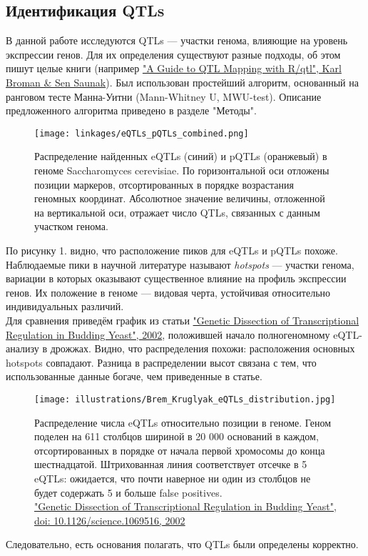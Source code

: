 \documentclass[11pt,a4paper]{report}
\theoremstyle{definition}
\theoremstyle{definition}
\theoremstyle{definition}
\begin{document}
	\subsection{Идентификация QTLs}
	   В данной работе исследуются QTLs — участки генома, влияющие на уровень экспрессии генов. Для их определения существуют разные подходы, об этом пишут целые книги (например \href{https://www.springer.com/gp/book/9780387921242}{"A Guide to QTL Mapping with R/qtl", Karl Broman \& Sen Saunak}). Был использован простейший алгоритм, основанный на ранговом тесте Манна-Уитни (Mann-Whitney U, MWU-test). Описание предложенного алгоритма приведено в разделе "Методы".
		\begin{figure}[H]
			\centering
			\texttt{[image: linkages/eQTLs\_pQTLs\_combined.png]}
			\caption{Распределение найденных eQTLs (синий) и pQTLs (оранжевый) в геноме Saccharomyces cerevisiae. По горизонтальной оси отложены позиции маркеров, отсортированных в порядке возрастания геномных координат. Абсолютное значение величины, отложенной на вертикальной оси, отражает число QTLs, связанных с данным участком генома.}
		\end{figure}
		По рисунку 1. видно, что расположение пиков для eQTLs и pQTLs похоже. Наблюдаемые пики в научной литературе называют \textit{hotspots} — участки генома, вариации в которых оказывают существенное влияние на профиль экспрессии генов. Их положение в геноме — видовая черта, устойчивая относительно индивидуальных различий.\\
		
		Для сравнения приведём график из статьи \href{http://science.sciencemag.org/content/296/5568/752.full}{"Genetic Dissection of Transcriptional Regulation in Budding Yeast", 2002}, положившей начало полногеномному eQTL-анализу в дрожжах. Видно, что распределения похожи: расположения основных hotspots совпадают. Разница в распределении высот связана с тем, что использованные данные богаче, чем приведенные в статье.
		
		\begin{figure}[H]
			\centering
			\texttt{[image: illustrations/Brem\_Kruglyak\_eQTLs\_distribution.jpg]}
			\caption{
				Распределение числа eQTLs относительно позиции в геноме. Геном поделен на 611 столбцов шириной в 20 000 оснований в каждом, отсортированных в порядке от начала первой хромосомы до конца шестнадцатой. Штрихованная линия соответствует отсечке в 5 eQTLs: ожидается, что почти наверное ни один из столбцов не будет содержать 5 и больше false positives.\\
				\href{http://science.sciencemag.org/content/296/5568/752.full}{"Genetic Dissection of Transcriptional Regulation in Budding Yeast", doi: 10.1126/science.1069516, 2002} 
		  }
		\end{figure}
		Следовательно, есть основания полагать, что QTLs были определены корректно.
\end{document}
